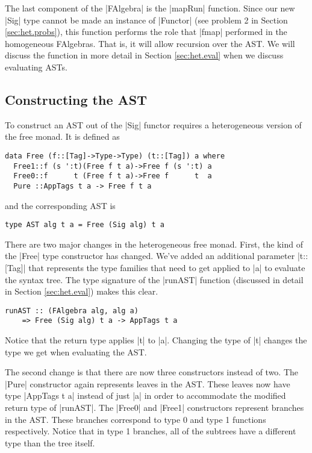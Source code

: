 \documentclass[preprint]{sigplanconf}
\theoremstyle{definition}
\begin{document}
The last component of the |FAlgebra| is the |mapRun| function.
Since our new |Sig| type cannot be made an instance of |Functor|
(see problem 2 in Section \ref{sec:het.probs}),
this function performs the role that |fmap| performed in the homogeneous FAlgebras.
That is, it will allow recursion over the AST.
We will discuss the function in more detail in Section \ref{sec:het.eval} when we discuss evaluating ASTs.

\subsection{Constructing the AST}

To construct an AST out of the |Sig| functor requires a heterogeneous version of the free monad.
It is defined as
\begin{lstlisting}
data Free (f::[Tag]->Type->Type) (t::[Tag]) a where
  Free1::f (s ':t)(Free f t a)->Free f (s ':t) a
  Free0::f      t (Free f t a)->Free f      t  a
  Pure ::AppTags t a -> Free f t a
\end{lstlisting}
and the corresponding AST is
\begin{lstlisting}
type AST alg t a = Free (Sig alg) t a
\end{lstlisting}
There are two major changes in the heterogeneous free monad.
First, the kind of the |Free| type constructor has changed.
We've added an additional parameter |t::[Tag]| that represents the type families that need to get applied to |a| to evaluate the syntax tree.
The type signature of the |runAST| function (discussed in detail in Section \ref{sec:het.eval}) makes this clear.
\begin{lstlisting}
runAST :: (FAlgebra alg, alg a)
    => Free (Sig alg) t a -> AppTags t a
\end{lstlisting}
Notice that the return type applies |t| to |a|.
Changing the type of |t| changes the type we get when evaluating the AST.

The second change is that there are now three constructors instead of two.
The |Pure| constructor again represents leaves in the AST.
These leaves now have type |AppTags t a| instead of just |a| in order to accommodate the modified return type of |runAST|.
The |Free0| and |Free1| constructors represent branches in the AST.
These branches correspond to type 0 and type 1 functions respectively.
Notice that in type 1 branches, all of the subtrees have a different type than the tree itself.
\end{document}
